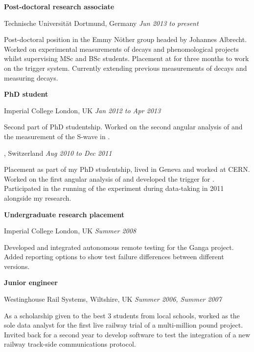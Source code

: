 \documentclass[10pt]{article}
\renewenvironment{compactitem}{
  \begin{list}{}{
    \setlength{\leftmargin}{1em}
    \setlength{\pltopsep}{\smallskipamount}
    \setlength{\plitemsep}{0.1pt}
\setlength{\plparsep}{0.1pt}
  }
}{
  \end{list}
}
\def\tud{Technische Universit\"at Dortmund}
\def\icl{Imperial College London}
\begin{document}
\textbf{Post-doctoral research associate}
\begin{compactitem}
\item {\tud, Germany}  \hfill \textit{Jun 2013 to present}
\begin{compactitem}
\item Post-doctoral position in the Emmy N\"other group headed by Johannes Albrecht. %
Worked on experimental measurements of \btosll decays and phenomological projects whilst supervising MSc and BSc students.
Placement at \cern for three months to work on the \lhcb trigger system.
Currently extending previous measurements of \btosll decays and measuring \btodll decays.
\end{compactitem}
\end{compactitem}

\textbf{PhD student}
\begin{compactitem}
\item \icl, UK    \hfill \textit{Jan 2012 to Apr 2013}
\begin{compactitem}
\item Second part of PhD studentship.
Worked on the second angular analysis of \BdKstmm and the measurement of the \kpi S-wave in \BdKstmm.
\end{compactitem}
\cern, Switzerland   \hfill \textit{Aug 2010 to Dec 2011}
\begin{compactitem}
\item Placement as part of my PhD studentship, lived in Geneva and worked at CERN.
Worked on the first angular analysis of \BdKstmm and developed the trigger for \lhcb.
Participated in the running of the \lhcb experiment during data-taking in 2011 alongside my research. 
\end{compactitem}
\end{compactitem}

\textbf{Undergraduate research placement} 
\begin{compactitem}
\item \icl, UK    \hfill \textit{Summer 2008}
\begin{compactitem}
\item Developed and integrated autonomous remote testing for the Ganga project.  
Added reporting options to show test failure differences between different versions.
\end{compactitem}
\end{compactitem}

\textbf{Junior engineer} 
\begin{compactitem}
\item Westinghouse Rail Systems, Wiltshire, UK   \hfill \textit{Summer 2006, Summer 2007}
\begin{compactitem}
\item As a scholarship given to the best 3 students from local schools, worked as the sole data analyst for the first live railway trial of a multi-million pound project. 
Invited back for a second year to develop software to test the integration of a new railway track-side communications protocol. 
\end{compactitem}
\end{compactitem}
\end{document}
